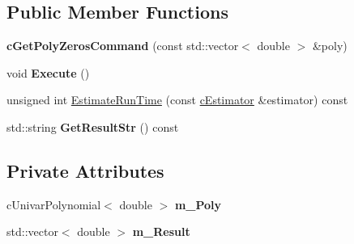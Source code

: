 \subsection*{Public Member Functions}
\begin{DoxyCompactItemize}
\item 
\hypertarget{classengine_1_1cGetPolyZerosCommand_aa1de71abdbaba658353ac02f387749e0}{{\bfseries c\-Get\-Poly\-Zeros\-Command} (const std\-::vector$<$ double $>$ \&poly)}\label{classengine_1_1cGetPolyZerosCommand_aa1de71abdbaba658353ac02f387749e0}

\item 
\hypertarget{classengine_1_1cGetPolyZerosCommand_a99adfb90c18abb33117e95e8bb446d35}{void {\bfseries Execute} ()}\label{classengine_1_1cGetPolyZerosCommand_a99adfb90c18abb33117e95e8bb446d35}

\item 
unsigned int \hyperlink{classengine_1_1cGetPolyZerosCommand_a1bd473cb3480f7378c351ef12cf66375}{Estimate\-Run\-Time} (const \hyperlink{classengine_1_1cEstimator}{c\-Estimator} \&estimator) const 
\item 
\hypertarget{classengine_1_1cGetPolyZerosCommand_a066bb37111083af836d634208eec21dc}{std\-::string {\bfseries Get\-Result\-Str} () const }\label{classengine_1_1cGetPolyZerosCommand_a066bb37111083af836d634208eec21dc}

\end{DoxyCompactItemize}
\subsection*{Private Attributes}
\begin{DoxyCompactItemize}
\item 
\hypertarget{classengine_1_1cGetPolyZerosCommand_a3e5684c654bfdfbdf7b897c3ec2c149e}{c\-Univar\-Polynomial$<$ double $>$ {\bfseries m\-\_\-\-Poly}}\label{classengine_1_1cGetPolyZerosCommand_a3e5684c654bfdfbdf7b897c3ec2c149e}

\item 
\hypertarget{classengine_1_1cGetPolyZerosCommand_a41c266482db4d3fa302434bda14cf96f}{std\-::vector$<$ double $>$ {\bfseries m\-\_\-\-Result}}\label{classengine_1_1cGetPolyZerosCommand_a41c266482db4d3fa302434bda14cf96f}

\end{DoxyCompactItemize}



